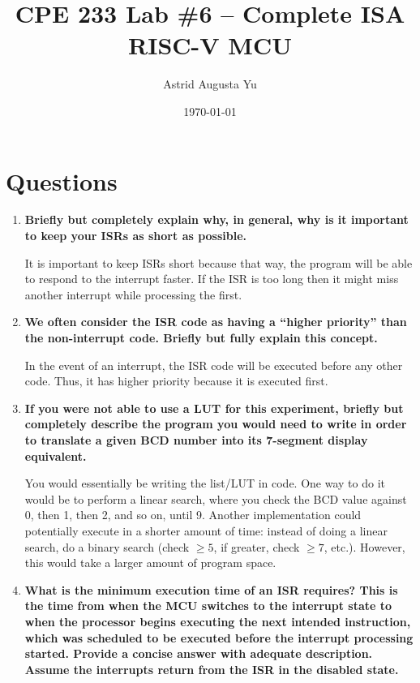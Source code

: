 \documentclass{article}
\author{Astrid Augusta Yu}
\title{CPE 233 Lab \#6 -- Complete ISA RISC-V MCU}
\date{\today}
\begin{document}
\maketitle

\tableofcontents

\section{Questions}

\begin{enumerate}
    \item\textbf{Briefly but completely explain why, in general, why is it important to keep your ISRs as short as possible.  }

    It is important to keep ISRs short because that way, the program will be able to respond to the interrupt faster. If the ISR is too long then it might miss another interrupt while processing the first.

    \item\textbf{We often consider the ISR code as having a “higher priority” than the non-interrupt code. Briefly but fully explain this concept.  }

    In the event of an interrupt, the ISR code will be executed before any other code. Thus, it has higher priority because it is executed first.

    \item\textbf{If you were not able to use a LUT for this experiment, briefly but completely describe the program you would need to write in order to translate a given BCD number into its 7-segment display equivalent.  }

    You would essentially be writing the list/LUT in code. One way to do it would be to perform a linear search, where you check the BCD value against 0, then 1, then 2, and so on, until 9. Another implementation could potentially execute in a shorter amount of time: instead of doing a linear search, do a binary search (check $\geq 5$, if greater, check $\geq 7$, etc.). However, this would take a larger amount of program space. 

    \item\textbf{What is the minimum execution time of an ISR requires? This is the time from when the MCU switches to the interrupt state to when the processor begins executing the next intended instruction, which was scheduled to be executed before the interrupt processing started. Provide a concise answer with adequate description. Assume the interrupts return from the ISR in the disabled state.  }


\end{enumerate}
\end{document}
